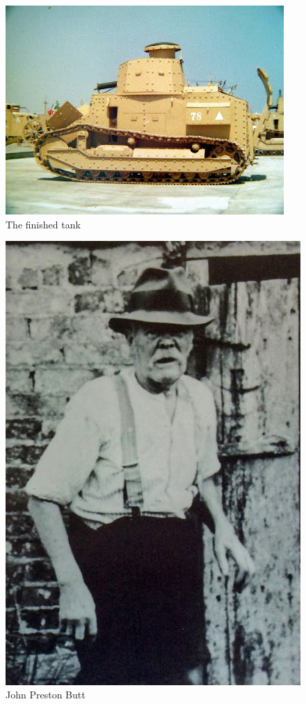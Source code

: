 \begin{figure}
  \centering
  \includegraphics[width=.8\linewidth]{pictures/cropped/Finished tank.jpg}
  \caption*{The finished tank}
\end{figure}

\begin{figure}
  \centering
  \includegraphics[width=.9\linewidth]{pictures/cropped/John Preston Butt.jpg}
  \caption*{John Preston Butt}
\end{figure}

